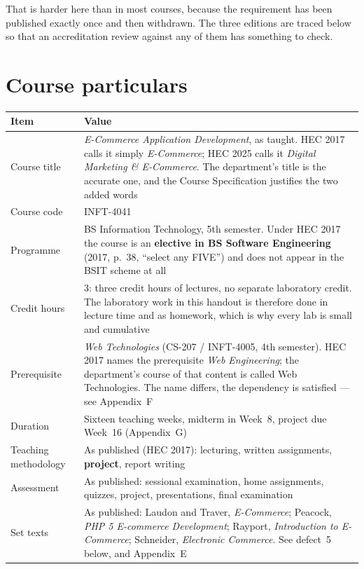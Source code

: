 That is harder here than in most courses, because the requirement has been
published exactly once and then withdrawn. The three editions are traced below
so that an accreditation review against any of them has something to check.

\section*{Course particulars}

\begin{longtable}{@{}L{4.2cm}L{11.0cm}@{}}
\toprule
{}
\textbf{Item} & \textbf{Value} \\
\midrule
\endhead
Course title & \emph{E-Commerce Application Development}, as taught. HEC 2017
calls it simply \emph{E-Commerce}; HEC 2025 calls it \emph{Digital Marketing \&
E-Commerce}. The department's title is the accurate one, and the Course
Specification justifies the two added words \\
Course code & INFT-4041 \\
Programme & BS Information Technology, 5th semester. Under HEC 2017 the course
is an \textbf{elective in BS Software Engineering} (2017, p.~38, ``select any
FIVE'') and does not appear in the BSIT scheme at all \\
Credit hours & 3: three credit hours of lectures, no separate laboratory credit.
The laboratory work in this handout is therefore done in lecture time and as
homework, which is why every lab is small and cumulative \\
Prerequisite & \emph{Web Technologies} (CS-207 / INFT-4005, 4th semester). HEC
2017 names the prerequisite \emph{Web Engineering}; the department's course of
that content is called Web Technologies. The name differs, the dependency is
satisfied --- see Appendix~F \\
Duration & Sixteen teaching weeks, midterm in Week~8, project due Week~16
(Appendix~G) \\
Teaching methodology & As published (HEC 2017): lecturing, written assignments,
\textbf{project}, report writing \\
Assessment & As published: sessional examination, home assignments, quizzes,
project, presentations, final examination \\
Set texts & As published: Laudon and Traver, \emph{E-Commerce}; Peacock,
\emph{PHP 5 E-commerce Development}; Rayport, \emph{Introduction to E-Commerce};
Schneider, \emph{Electronic Commerce}. See defect~5 below, and Appendix~E \\
\bottomrule
\end{longtable}

